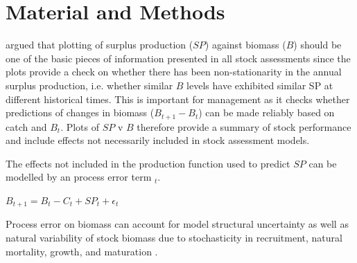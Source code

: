 \documentclass[12pt,doublespacing,a4paper]{ouparticle}
\begin{document}
\section{Material and Methods}


\cite{walters2008surplus} argued that plotting of surplus production ($SP$) against biomass ($B$) should be one of the basic pieces of information presented in all stock assessments since the plots provide a check on whether there has been non-stationarity in the annual surplus production, i.e. whether similar $B$ levels have exhibited similar SP at different historical times. This is important for management as it checks whether predictions of changes in biomass ($B_{t+1} - B_t$) can be made reliably based on catch and $B_t$. Plots of $SP$ v $B$ therefore provide a summary of stock performance and include effects not necessarily included in stock assessment models. 

The effects not included in the production function used to predict $SP$ can be modelled by an process error term \epsilon$_t$.

$B_{t+1}=B_t-C_t+SP_t+\epsilon_t$
 
 Process error on biomass can account for model structural uncertainty as well as natural variability of stock biomass due to stochasticity in recruitment, natural mortality, growth, and maturation \citep{francis2011data,Meyer1999,Thorson2015, Winker2018}.


\end{document}
